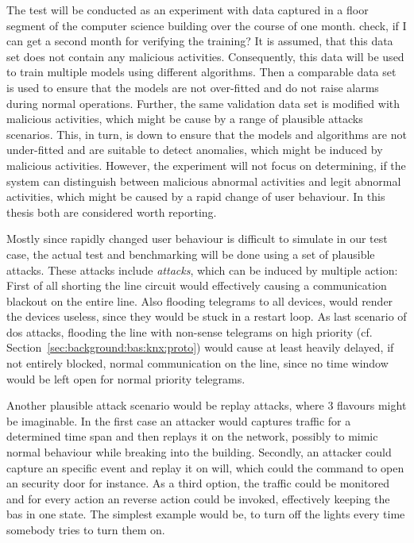 The test will be conducted as an experiment with data captured in a floor segment of the computer science building over the course of one month. \alert{check, if I can get a second month for verifying the training?} It is assumed, that this data set does not contain any malicious activities.
Consequently, this data will be used to train multiple models using different algorithms.
Then a comparable data set is used to ensure that the models are not over-fitted and do not raise alarms during normal operations.
Further, the same validation data set is modified with malicious activities, which might be cause by a range of plausible attacks scenarios.
This, in turn, is down to ensure that the models and algorithms are not under-fitted and are suitable to detect anomalies, which might be induced by malicious activities.
However, the experiment will not focus on determining, if the system can distinguish between malicious abnormal activities and legit abnormal activities, which might be caused by a rapid change of user behaviour. In this thesis both are considered worth reporting.

Mostly since rapidly changed user behaviour is difficult to simulate in our test case, the actual test and benchmarking will be done using a set of plausible attacks. 
These attacks include \emph{ attacks}, which can be induced by multiple action: First of all shorting the line circuit would effectively causing a communication blackout on the entire line. Also flooding  telegrams to all devices, would render the devices useless, since they would be stuck in a restart loop. As last scenario of \gls{dos} attacks, flooding the line with non-sense telegrams on high priority (cf. Section~\ref{sec:background:bas:knx:proto}) would cause at least heavily delayed, if not entirely blocked, normal communication on the line, since no time window would be left open for normal priority telegrams.

Another plausible attack scenario would be replay attacks, where 3 flavours might be imaginable.
In the first case an attacker would captures traffic for a determined time span and then replays it on the network, possibly to mimic normal behaviour while breaking into the building.
Secondly, an attacker could capture an specific event and replay it on will, which could the command to open an security door for instance.
As a third option, the traffic could be monitored and for every action an reverse action could be invoked, effectively keeping the \gls{bas} in one state. The simplest example would be, to turn off the lights every time somebody tries to turn them on.


